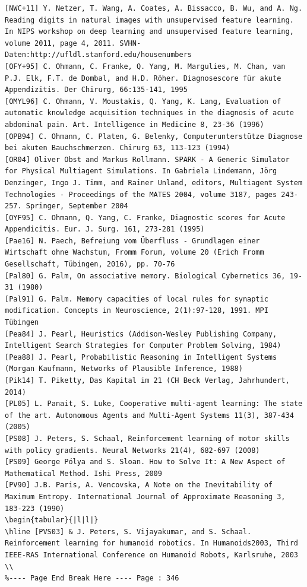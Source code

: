 \documentclass[10pt]{article}
\begin{document}
\begin{verbatim}
[NWC+11] Y. Netzer, T. Wang, A. Coates, A. Bissacco, B. Wu, and A. Ng. Reading digits in natural images with unsupervised feature learning. In NIPS workshop on deep learning and unsupervised feature learning, volume 2011, page 4, 2011. SVHN-Daten:http://ufldl.stanford.edu/housenumbers
[OFY+95] C. Ohmann, C. Franke, Q. Yang, M. Margulies, M. Chan, van P.J. Elk, F.T. de Dombal, and H.D. Röher. Diagnosescore für akute Appendizitis. Der Chirurg, 66:135-141, 1995
[OMYL96] C. Ohmann, V. Moustakis, Q. Yang, K. Lang, Evaluation of automatic knowledge acquisition techniques in the diagnosis of acute abdominal pain. Art. Intelligence in Medicine 8, 23-36 (1996)
[OPB94] C. Ohmann, C. Platen, G. Belenky, Computerunterstütze Diagnose bei akuten Bauchschmerzen. Chirurg 63, 113-123 (1994)
[OR04] Oliver Obst and Markus Rollmann. SPARK - A Generic Simulator for Physical Multiagent Simulations. In Gabriela Lindemann, Jörg Denzinger, Ingo J. Timm, and Rainer Unland, editors, Multiagent System Technologies - Proceedings of the MATES 2004, volume 3187, pages 243-257. Springer, September 2004
[OYF95] C. Ohmann, Q. Yang, C. Franke, Diagnostic scores for Acute Appendicitis. Eur. J. Surg. 161, 273-281 (1995)
[Pae16] N. Paech, Befreiung vom Überfluss - Grundlagen einer Wirtschaft ohne Wachstum, Fromm Forum, volume 20 (Erich Fromm Gesellschaft, Tübingen, 2016), pp. 70-76
[Pal80] G. Palm, On associative memory. Biological Cybernetics 36, 19-31 (1980)
[Pal91] G. Palm. Memory capacities of local rules for synaptic modification. Concepts in Neuroscience, 2(1):97-128, 1991. MPI Tübingen
[Pea84] J. Pearl, Heuristics (Addison-Wesley Publishing Company, Intelligent Search Strategies for Computer Problem Solving, 1984)
[Pea88] J. Pearl, Probabilistic Reasoning in Intelligent Systems (Morgan Kaufmann, Networks of Plausible Inference, 1988)
[Pik14] T. Piketty, Das Kapital im 21 (CH Beck Verlag, Jahrhundert, 2014)
[PL05] L. Panait, S. Luke, Cooperative multi-agent learning: The state of the art. Autonomous Agents and Multi-Agent Systems 11(3), 387-434 (2005)
[PS08] J. Peters, S. Schaal, Reinforcement learning of motor skills with policy gradients. Neural Networks 21(4), 682-697 (2008)
[PS09] George Pólya and S. Sloan. How to Solve It: A New Aspect of Mathematical Method. Ishi Press, 2009
[PV90] J.B. Paris, A. Vencovska, A Note on the Inevitability of Maximum Entropy. International Journal of Approximate Reasoning 3, 183-223 (1990)
\begin{tabular}{|l|l|}
\hline [PVS03] & J. Peters, S. Vijayakumar, and S. Schaal. Reinforcement learning for humanoid robotics. In Humanoids2003, Third IEEE-RAS International Conference on Humanoid Robots, Karlsruhe, 2003 \\
%---- Page End Break Here ---- Page : 346


\end{verbatim}
\end{document}
